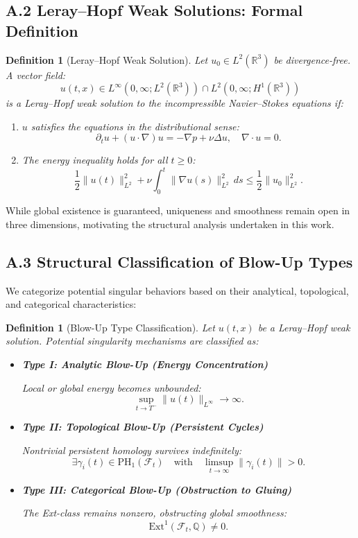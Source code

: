 \documentclass[11pt]{article}
\newtheorem{definition}[theorem]{Definition}
\begin{document}
\subsection*{A.2 Leray–Hopf Weak Solutions: Formal Definition}

\begin{definition}[Leray–Hopf Weak Solution]
Let \( u_0 \in L^2(\mathbb{R}^3) \) be divergence-free. A vector field:
\[
u(t, x) \in L^\infty(0,\infty; L^2(\mathbb{R}^3)) \cap L^2(0,\infty; H^1(\mathbb{R}^3))
\]
is a Leray–Hopf weak solution to the incompressible Navier–Stokes equations if:

\begin{enumerate}
  \item \( u \) satisfies the equations in the distributional sense:
  \[
  \partial_t u + (u \cdot \nabla) u = - \nabla p + \nu \Delta u, \quad \nabla \cdot u = 0.
  \]
  \item The energy inequality holds for all \( t \geq 0 \):
  \[
  \frac{1}{2} \| u(t) \|_{L^2}^2 + \nu \int_0^t \| \nabla u(s) \|_{L^2}^2 \, ds \leq \frac{1}{2} \| u_0 \|_{L^2}^2.
  \]
\end{enumerate}
\end{definition}

While global existence is guaranteed, uniqueness and smoothness remain open in three dimensions, motivating the structural analysis undertaken in this work.

\subsection*{A.3 Structural Classification of Blow-Up Types}

We categorize potential singular behaviors based on their analytical, topological, and categorical characteristics:

\begin{definition}[Blow-Up Type Classification]
Let \( u(t,x) \) be a Leray–Hopf weak solution. Potential singularity mechanisms are classified as:

\begin{itemize}
  \item \textbf{Type I: Analytic Blow-Up (Energy Concentration)}
  
  Local or global energy becomes unbounded:
  \[
  \sup_{t \to T^-} \| u(t) \|_{L^\infty} \to \infty.
  \]

  \item \textbf{Type II: Topological Blow-Up (Persistent Cycles)}
  
  Nontrivial persistent homology survives indefinitely:
  \[
  \exists \gamma_i(t) \in \mathrm{PH}_1(\mathcal{F}_t) \quad \text{with} \quad \limsup_{t \to \infty} \| \gamma_i(t) \| > 0.
  \]

  \item \textbf{Type III: Categorical Blow-Up (Obstruction to Gluing)}
  
  The Ext-class remains nonzero, obstructing global smoothness:
  \[
  \mathrm{Ext}^1(\mathcal{F}_t, \mathbb{Q}) \neq 0.
  \]
\end{itemize}
\end{definition}
\end{document}
